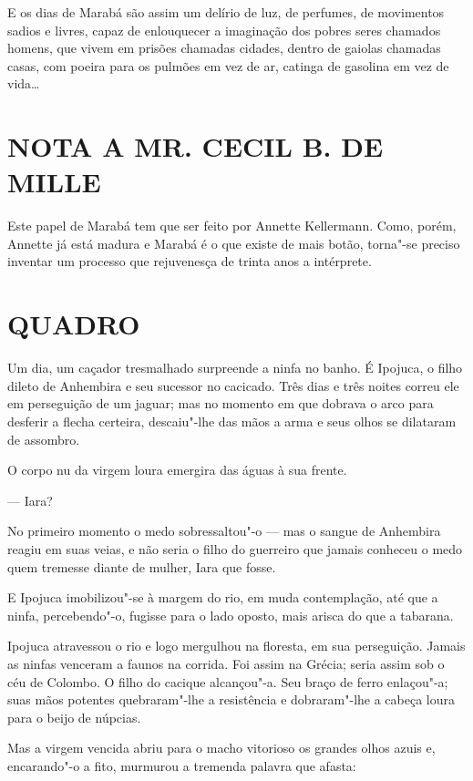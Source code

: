 E os dias de Marabá são assim um delírio de luz, de perfumes, de
movimentos sadios e livres, capaz de enlouquecer a imaginação dos pobres
seres chamados homens, que vivem em prisões chamadas cidades, dentro de
gaiolas chamadas casas, com poeira para os pulmões em vez de ar, catinga
de gasolina em vez de vida\ldots{}

\section*{NOTA A MR. CECIL B. DE MILLE}

Este papel de Marabá tem que ser feito por Annette Kellermann. Como,
porém, Annette já está madura e Marabá é o que existe de mais botão,
torna"-se preciso inventar um processo que rejuvenesça de trinta anos a
intérprete.

\section*{QUADRO}

Um dia, um caçador tresmalhado surpreende a ninfa no banho. É Ipojuca, o
filho dileto de Anhembira e seu sucessor no cacicado. Três dias e três
noites correu ele em perseguição de um jaguar; mas no momento em que
dobrava o arco para desferir a flecha certeira, descaiu"-lhe das mãos a
arma e seus olhos se dilataram de assombro.

O corpo nu da virgem loura emergira das águas à sua frente.

--- Iara?

No primeiro momento o medo sobressaltou"-o --- mas o sangue de Anhembira
reagiu em suas veias, e não seria o filho do guerreiro que jamais
conheceu o medo quem tremesse diante de mulher, Iara que fosse.

E Ipojuca imobilizou"-se à margem do rio, em muda contemplação, até que a
ninfa, percebendo"-o, fugisse para o lado oposto, mais arisca do que a
tabarana.

Ipojuca atravessou o rio e logo mergulhou na floresta, em sua
perseguição. Jamais as ninfas venceram a faunos na corrida. Foi assim na
Grécia; seria assim sob o céu de Colombo. O filho do cacique alcançou"-a.
Seu braço de ferro enlaçou"-a; suas mãos potentes quebraram"-lhe a
resistência e dobraram"-lhe a cabeça loura para o beijo de núpcias.

Mas a virgem vencida abriu para o macho vitorioso os grandes olhos azuis
e, encarando"-o a fito, murmurou a tremenda palavra que afasta:

